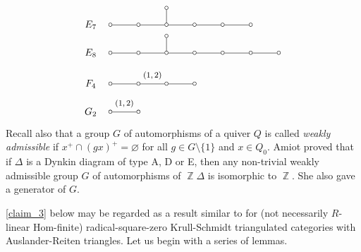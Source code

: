 \documentclass[12pt]{amsart}
\numberwithin{equation}{subsection}
\theoremstyle{plain}
\theoremstyle{definition}
\newcommand{\Z}{\operatorname{\mathbb{Z}}\nolimits}
\begin{document}
\[\begin{tikzpicture}[scale=1,inner sep=-.3,outer sep=-.3]
\node (e7) at (6.6,-1.) {$E_7$};
\node (e70) at (9.3,-.4) {$\circ$};
\node (e71) at (7.3,-1.) {$\circ$};
\node (e72) at (8.3,-1.) {$\circ$};
\node (e73) at (9.3,-1.) {$\circ$};
\node (e75) at (10.3,-1.) {$\circ$};
\node (e76) at (11.3,-1.) {$\circ$};
\node (e77) at (12.3,-1.) {$\circ$};
\draw[-] (e70) -- (e73) ;
\draw[-] (e71) -- (e72) ;
\draw[-] (e72) -- (e73) ;
\draw[-] (e73) -- (e75) ;
\draw[-] (e75) -- (e76) ;
\draw[-] (e76) -- (e77) ;
\node (e8) at (6.6,-2.) {$E_8$};
\node (e80) at (9.3,-1.4) {$\circ$};
\node (e81) at (7.3,-2.) {$\circ$};
\node (e82) at (8.3,-2.) {$\circ$};
\node (e83) at (9.3,-2.) {$\circ$};
\node (e85) at (10.3,-2.) {$\circ$};
\node (e86) at (11.3,-2.) {$\circ$};
\node (e87) at (12.3,-2.) {$\circ$};
\node (e88) at (13.3,-2.) {$\circ$};
\draw[-] (e80) -- (e83) ;
\draw[-] (e81) -- (e82) ;
\draw[-] (e82) -- (e83) ;
\draw[-] (e83) -- (e85) ;
\draw[-] (e85) -- (e86) ;
\draw[-] (e86) -- (e87) ;
\draw[-] (e87) -- (e88) ;
\node (f) at (6.6,-3.1) {$F_4$};
\node (f1) at (7.3,-3.1) {$\circ$};
\node (f2) at (8.3,-3.1) {$\circ$};
\node (f3) at (9.3,-3.1) {$\circ$};
\node (f4) at (10.3,-3.1) {$\circ$};
\node at (8.8,-2.8) {\footnotesize $(1,2)$};
\draw[-] (f1) -- (f2) ;
\draw[-] (f2) -- (f3) ;
\draw[-] (f3) -- (f4) ;
\node (g) at (6.6,-4.1) {$G_2$};
\node (g1) at (7.3,-4.1) {$\circ$};
\node (g2) at (8.3,-4.1) {$\circ$};
\node at (7.8,-3.8) {\footnotesize $(1,2)$};
\draw[-] (g1) -- (g2) ;
\end{tikzpicture}
\]
Recall also that a group $G$ of automorphisms of a quiver $Q$ is called {\it weakly admissible} \cite[Section 4]{Dieterich_2006} if $x^+ \cap (gx)^+ = \varnothing$ for all $g \in G\setminus\{1\}$ and $x \in Q_0$.
Amiot \cite[Theorem 2.1]{Amiot_2007} proved that if $\Delta$ is a Dynkin diagram of type A, D or E, then any non-trivial weakly admissible group $G$ of automorphisms of $\Z\Delta$ is isomorphic to $\Z$.
She also gave a generator of $G$.





\cref{claim_3} below may be regarded as a result similar to \cite[Theorem 3.5]{Krause_2012} for (not necessarily $R$-linear Hom-finite) radical-square-zero Krull-Schmidt triangulated categories with Auslander-Reiten triangles.
Let us begin with a series of lemmas.
\end{document}
